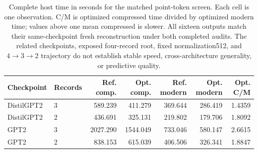 \begin{table}[t]
\centering\small
\begin{tabular}{llrrrrr}
\toprule
Checkpoint & Records & Ref. comp. & Opt. comp. & Ref. modern & Opt. modern & Opt. C/M \\
\midrule
DistilGPT2 & 3 & 589.239 & 411.279 & 369.644 & 286.419 & 1.4359 \\
DistilGPT2 & 2 & 436.691 & 325.131 & 219.802 & 179.706 & 1.8092 \\
GPT2 & 3 & 2027.290 & 1544.049 & 733.046 & 580.147 & 2.6615 \\
GPT2 & 2 & 838.153 & 615.039 & 406.506 & 326.341 & 1.8847 \\
\bottomrule
\end{tabular}
\caption{Complete host time in seconds for the matched point-token screen. Each cell is one observation. C/M is optimized compressed time divided by optimized modern time; values above one mean compressed is slower. All sixteen outputs match their same-checkpoint fresh reconstruction under both completed audits. The related checkpoints, exposed four-record root, fixed normalization512, and $4\to3\to2$ trajectory do not establish stable speed, cross-architecture generality, or predictive quality.}
\label{tab:matched-token}
\end{table}

